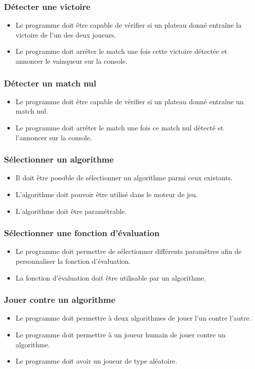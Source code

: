 \huge\documentclass{article}
\begin{document}
\subsubsection{Détecter une victoire}
\begin{itemize}
    \item Le programme doit être capable de vérifier si un plateau donné entraîne la victoire de l'un des deux joueurs.
    \item Le programme doit arrêter le match une fois cette victoire détectée et annoncer le vainqueur sur la console.
\end{itemize}
\medskip
\subsubsection{Détecter un match nul}
\begin{itemize}
    \item Le programme doit être capable de vérifier si un plateau donné entraîne un match nul.
    \item Le programme doit arrêter le match une fois ce match nul détecté et l'annoncer sur la console.
\end{itemize}
\medskip
\subsubsection{Sélectionner un algorithme}
\begin{itemize}
    \item Il doit être possible de sélectionner un algorithme parmi ceux existants.
    \item L'algorithme doit pouvoir être utilisé dans le moteur de jeu.
    \item L'algorithme doit être paramétrable.
\end{itemize}
\medskip
\subsubsection{Sélectionner une fonction d'évaluation}
\begin{itemize}
    \item Le programme doit permettre de sélectionner différents paramètres afin de personnaliser la fonction d'évaluation.
    \item La fonction d'évaluation doit être utilisable par un algorithme.
\end{itemize}
\medskip
\subsubsection{Jouer contre un algorithme}
\begin{itemize}
    \item Le programme doit permettre à deux algorithmes de jouer l'un contre l'autre.
    \item Le programme doit permettre à un joueur humain de jouer contre un algorithme.
    \item Le programme doit avoir un joueur de type aléatoire.
\end{itemize}
\medskip
\end{document}
